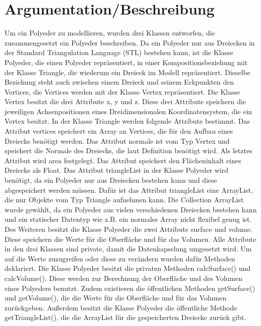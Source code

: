 \documentclass[a4paper,11pt]{scrartcl}
\begin{document}
	\section*{Argumentation/Beschreibung}
	Um ein Polyeder zu modellieren, wurden drei Klassen entworfen, die zusammengesetzt ein Polyeder beschreiben. Da ein Polyeder nur aus Dreiecken in der Standard Triangulation Language (STL) bestehen kann, ist die Klasse Polyeder, die einen Polyeder repräsentiert, in einer Kompositionsbeziehung mit der Klasse Triangle, die wiederum ein Dreieck im Modell repräsentiert. Dieselbe Beziehung steht auch zwischen einem Dreieck und seinem Eckpunkten den Vertices, die Vertices werden mit der Klasse Vertex repräsentiert. Die Klasse Vertex besitzt die drei Attribute x, y und z. Diese drei Attribute speichern die jeweiligen Achsenpositionen eines Dreidimensionalen Koordinatensystem, die ein Vertex besitzt. In der Klasse Triangle werden folgende Attribute bestimmt. Das Attribut vertices speichert ein Array an Vertices, die für den Aufbau eines Dreiecks benötigt werden. Das Attribut normale ist vom Typ Vertex und speichert die Normale des Dreiecks, die laut Definition benötigt wird. Als letztes Attribut wird area festgelegt. Das Attribut speichert den Flächeninhalt eines Dreiecks als Float. Das Attribut triangleList in der Klasse Polyeder wird benötigt, da ein Polyeder nur aus Dreiecken bestehen kann und diese abgespeichert werden müssen. Dafür ist das Attribut triangleList eine ArrayList, die nur Objekte vom Typ Triangle aufnehmen kann. Die Collection ArrayList wurde gewählt, da ein Polyeder aus vielen verschiedenen Dreiecken bestehen kann und ein statischer Datentyp wie z.B. ein normales Array nicht flexibel genug ist. Des Weiteren besitzt die Klasse Polyeder die zwei Attribute surface und volume. Diese speichern die Werte für die Oberfläche und für das Volumen. Alle Attribute in den drei Klassen sind private, damit die Datenkapselung umgesetzt wird. Um auf die Werte zuzugreifen oder diese zu verändern wurden dafür Methoden deklariert. 
	Die Klasse Polyeder besitzt die privaten Methoden calcSurface() und calcVolume(). Diese werden zur Berechnung der Oberfläche und des Volumen eines Polyeders benutzt. Zudem existieren die öffentlichen Methoden getSurface() und getVolume(), die die Werte für die Oberfläche und für das Volumen zurückgeben. Au\ss erdem besitzt die Klasse Polyeder die öffentliche Methode getTriangleList(), die die ArrayList für die gespeicherten Dreiecke zurück gibt.  
\end{document}
